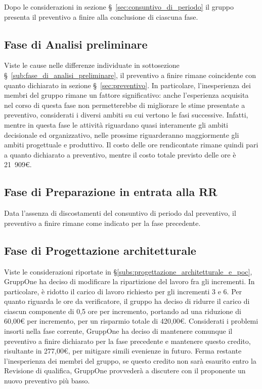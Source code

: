 \documentclass[../piano-di-progetto.tex]{subfiles}
\begin{document}
Dopo le considerazioni in sezione §~\ref{sec:consuntivo_di_periodo} il gruppo presenta il preventivo a finire alla conclusione di ciascuna fase.
\subsection{Fase di Analisi preliminare}%
\label{sub:fase_di_analisi_preliminare_2}
Viste le cause nelle differenze individuate in sottosezione §~\ref{sub:fase_di_analisi_preliminare}, il preventivo a finire rimane coincidente con quanto dichiarato in sezione §~\ref{sec:preventivo}. In particolare, l'inesperienza dei membri del gruppo rimane un fattore significativo: anche l'esperienza acquisita nel corso di questa fase non permetterebbe di migliorare le stime presentate a preventivo, considerati i diversi ambiti su cui vertono le fasi successive.
Infatti, mentre in questa fase le attività riguardano quasi interamente gli ambiti decisionale ed organizzativo, nelle prossime riguarderanno maggiormente gli ambiti progettuale e produttivo.
Il costo delle ore rendicontate rimane quindi pari a quanto dichiarato a preventivo, mentre il costo totale previsto delle ore è 21~909€.
\subsection{Fase di Preparazione in entrata alla RR}%
\label{sub:preventivo_a_finire/fase_di_preparazione_in_entrata_alla_rr}
Data l'assenza di discostamenti del consuntivo di periodo dal preventivo, il preventivo a finire rimane come indicato per la fase precedente.
\subsection{Fase di Progettazione architetturale}%
\label{sub:preventivo_a_finire/fase_di_progettazione_architetturale}

Viste le considerazioni riportate in §\ref{subs:progettazione_architetturale_e_poc}, GruppOne ha deciso di modificare la ripartizione del lavoro fra gli incrementi.
In particolare, è ridotto il carico di lavoro richiesto per gli incrementi 3 e 6.
Per quanto riguarda le ore da verificatore, il gruppo ha deciso di ridurre il carico di ciascun componente di 0,5 ore per incremento, portando ad una riduzione di 60,00€ per incremento, per un risparmio totale di 420,00€.
Considerati i problemi insorti nella fase corrente, GruppOne ha deciso di mantenere comunque il preventivo a finire dichiarato per la fase precedente e mantenere questo credito, risultante in 277,00€, per mitigare simili evenienze in futuro.
Ferma restante l'inesperienza dei membri del gruppo, se questo credito non sarà esaurito entro la Revisione di qualifica, GruppOne provvederà a discutere con il proponente un nuovo preventivo più basso.
\end{document}
